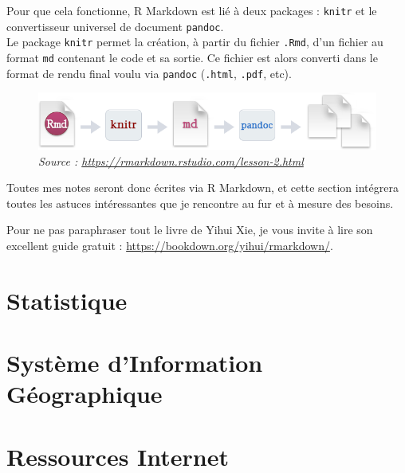 \documentclass[
]{book}
\begin{document}
Pour que cela fonctionne, R Markdown est lié à deux packages : \texttt{knitr} et le
convertisseur universel de document \texttt{pandoc}.\\
Le package \texttt{knitr} permet la création, à partir du fichier \texttt{.Rmd}, d'un fichier
au format \texttt{md} contenant le code et sa sortie. Ce fichier est alors converti
dans le format de rendu final voulu via \texttt{pandoc} (\texttt{.html}, \texttt{.pdf}, etc).

\begin{figure}
\centering
\includegraphics{image/rmarkdownflow.png}
\caption{\emph{Source : \url{https://rmarkdown.rstudio.com/lesson-2.html}}}
\end{figure}

Toutes mes notes seront donc écrites via R Markdown, et cette section intégrera
toutes les astuces intéressantes que je rencontre au fur et à mesure des
besoins.

Pour ne pas paraphraser tout le livre de Yihui Xie, je vous invite à
lire son excellent guide gratuit : \url{https://bookdown.org/yihui/rmarkdown/}.

\hypertarget{statistique}{%
\chapter{Statistique}\label{statistique}}

\hypertarget{SIG}{%
\chapter{Système d'Information Géographique}\label{SIG}}

\hypertarget{web-sources}{%
\chapter{Ressources Internet}\label{web-sources}}

\printbibliography
\end{document}
